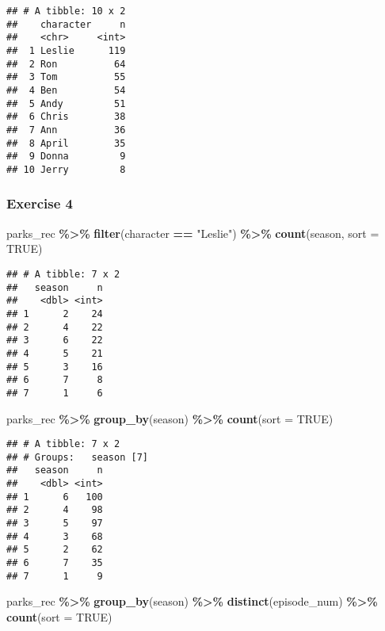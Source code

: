 \documentclass[
]{article}
\newenvironment{Shaded}{\begin{snugshade}}{\end{snugshade}}
\newcommand{\AttributeTok}[1]{\textcolor[rgb]{0.13,0.29,0.53}{#1}}
\newcommand{\ConstantTok}[1]{\textcolor[rgb]{0.56,0.35,0.01}{#1}}
\newcommand{\FunctionTok}[1]{\textcolor[rgb]{0.13,0.29,0.53}{\textbf{#1}}}
\newcommand{\NormalTok}[1]{#1}
\newcommand{\SpecialCharTok}[1]{\textcolor[rgb]{0.81,0.36,0.00}{\textbf{#1}}}
\newcommand{\StringTok}[1]{\textcolor[rgb]{0.31,0.60,0.02}{#1}}
\begin{document}
\begin{verbatim}
## # A tibble: 10 x 2
##    character     n
##    <chr>     <int>
##  1 Leslie      119
##  2 Ron          64
##  3 Tom          55
##  4 Ben          54
##  5 Andy         51
##  6 Chris        38
##  7 Ann          36
##  8 April        35
##  9 Donna         9
## 10 Jerry         8
\end{verbatim}

\subsubsection{Exercise 4}\label{exercise-4}

\begin{Shaded}
\begin{Highlighting}[]
\NormalTok{parks\_rec }\SpecialCharTok{\%\textgreater{}\%}
  \FunctionTok{filter}\NormalTok{(character }\SpecialCharTok{==} \StringTok{"Leslie"}\NormalTok{) }\SpecialCharTok{\%\textgreater{}\%}
  \FunctionTok{count}\NormalTok{(season, }\AttributeTok{sort =} \ConstantTok{TRUE}\NormalTok{)}
\end{Highlighting}
\end{Shaded}

\begin{verbatim}
## # A tibble: 7 x 2
##   season     n
##    <dbl> <int>
## 1      2    24
## 2      4    22
## 3      6    22
## 4      5    21
## 5      3    16
## 6      7     8
## 7      1     6
\end{verbatim}

\begin{Shaded}
\begin{Highlighting}[]
\NormalTok{parks\_rec }\SpecialCharTok{\%\textgreater{}\%}
  \FunctionTok{group\_by}\NormalTok{(season) }\SpecialCharTok{\%\textgreater{}\%}
  \FunctionTok{count}\NormalTok{(}\AttributeTok{sort =} \ConstantTok{TRUE}\NormalTok{)}
\end{Highlighting}
\end{Shaded}

\begin{verbatim}
## # A tibble: 7 x 2
## # Groups:   season [7]
##   season     n
##    <dbl> <int>
## 1      6   100
## 2      4    98
## 3      5    97
## 4      3    68
## 5      2    62
## 6      7    35
## 7      1     9
\end{verbatim}

\begin{Shaded}
\begin{Highlighting}[]
\NormalTok{parks\_rec }\SpecialCharTok{\%\textgreater{}\%}
  \FunctionTok{group\_by}\NormalTok{(season) }\SpecialCharTok{\%\textgreater{}\%}
  \FunctionTok{distinct}\NormalTok{(episode\_num) }\SpecialCharTok{\%\textgreater{}\%} 
  \FunctionTok{count}\NormalTok{(}\AttributeTok{sort =} \ConstantTok{TRUE}\NormalTok{)}
\end{Highlighting}
\end{Shaded}
\end{document}
